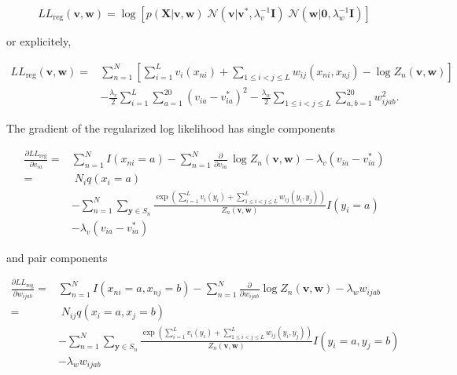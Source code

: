 \documentclass[11pt,a4paper,twoside]{book}
\newcommand{\eq}{\!=\!}
\newcommand{\Gauss}{\mathcal{N}}
\newcommand{\I}{\mathbf{I}}
\newcommand{\LLreg}{L\!L_\mathrm{reg}}
\newcommand{\Sn}{S_n}
\renewcommand{\v}{\mathbf{v}}
\newcommand{\via}{v_{ia}}
\newcommand{\w}{\mathbf{w}}
\newcommand{\wijab}{w_{ijab}}
\newcommand{\X}{\mathbf{X}}
\theoremstyle{definition}
\theoremstyle{definition}
\theoremstyle{remark}
\begin{document}
\begin{equation}
    \LLreg(\v,\w)  = \log \left[ p(\X | \v,\w) \;  \Gauss (\v | \v^*, \lambda_v^{-1} \I)  \; \Gauss( \w | \boldsymbol 0, \lambda_w^{-1} \I) \right] 
\end{equation}

or explicitely,

\begin{align}
    \LLreg(\v,\w) =& \sum_{n=1}^N  \left[ \sum_{i=1}^L v_i(x_{ni}) + \sum_{1\le i<j\le L} w_{ij}(x_{ni},x_{nj}) - \log Z_n(\v,\w) \right] \nonumber\\
                    & - \frac{\lambda_v}{2} \!\! \sum_{i=1}^L \sum_{a=1}^{20} (\via - \via^*)^2  - \frac{\lambda_w}{2}  \sum_{1 \le i < j \le L} \sum_{a,b=1}^{20} \wijab^2 .
\end{align}

The gradient of the regularized log likelihood has single components

\begin{align}
    \frac{\partial \LLreg}{\partial \via} =& \sum_{n=1}^N I(x_{ni}=a) - \sum_{n=1}^N \frac{\partial}{\partial \via} \, \log Z_n(\v,\w) - \lambda_v (\via - \via^*) \nonumber\\
                                          =& \; N_i q(x_i \eq a) \nonumber\\
                                          & - \sum_{n=1}^N \sum_{\mathbf{y} \in \Sn} \frac{  \exp \left( \sum_{i=1}^L v_i(y_i) + \sum_{1 \le i<j \le L}^L w_{ij}(y_i,y_j) \right) }{Z_n(\v,\w)}  I(y_i=a) \nonumber\\
                                          & - \lambda_v (\via - \via^*) 
\label{eq:gradient-LLreg-single}
\end{align}

and pair components

\begin{align}
    \frac{\partial \LLreg}{\partial \wijab} =& \sum_{n=1}^N I(x_{ni} \eq a, x_{nj} \eq b) - \sum_{n=1}^N \frac{\partial}{\partial \wijab} \log Z_n(\v,\w)  - \lambda_w \wijab \nonumber\\
                                            =& \; N_{ij} q(x_i \eq a, x_j=b) \nonumber\\
                                            & - \sum_{n=1}^N \sum_{\mathbf{y} \in \Sn} \frac{ \exp \left( \sum_{i=1}^L v_i(y_i) + \sum_{1 \le i<j \le L}^L w_{ij}(y_i,y_j) \right) }{Z_n(\v,\w)} I(y_i \eq a, y_j \eq b) \nonumber\\
                                            & - \lambda_w \wijab  
\label{eq:gradient-LLreg-pair}
\end{align}
\end{document}

